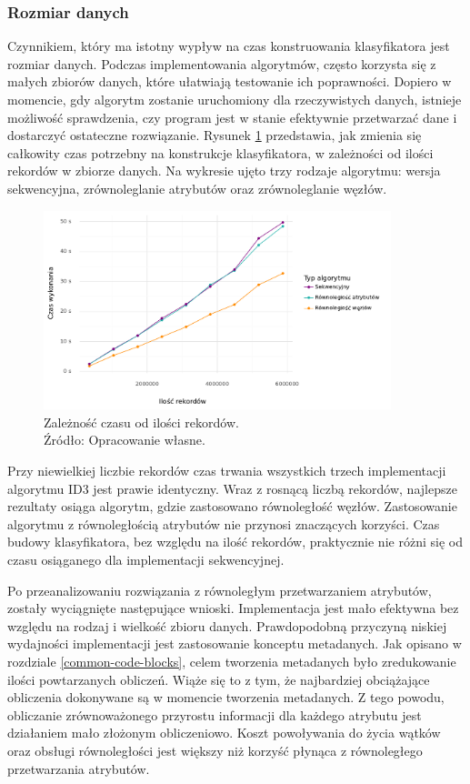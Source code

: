 \documentclass[12pt]{article}
\begin{document}
\subsubsection{Rozmiar danych}
Czynnikiem, który ma istotny wypływ na czas konstruowania klasyfikatora jest rozmiar
danych. Podczas implementowania algorytmów, często korzysta się z małych zbiorów danych,
które ułatwiają testowanie ich poprawności. Dopiero w momencie, gdy algorytm zostanie
uruchomiony dla rzeczywistych danych, istnieje możliwość sprawdzenia, czy program jest w stanie
efektywnie przetwarzać dane i dostarczyć ostateczne rozwiązanie. 
Rysunek \ref{fig:analysis} przedstawia, jak zmienia się całkowity czas potrzebny na konstrukcje
klasyfikatora, w zależności od ilości rekordów w zbiorze danych. Na wykresie ujęto trzy rodzaje algorytmu:
wersja sekwencyjna, zrównoleglanie atrybutów oraz zrównoleglanie węzłów.

\begin{figure}[H]
    \centering
	\includegraphics[width=0.9\textwidth]{analysis.pdf}
    \caption{Zależność czasu od ilości rekordów.\\Źródło: Opracowanie własne.}
    \label{fig:analysis}
\end{figure}

Przy niewielkiej liczbie rekordów czas trwania wszystkich trzech implementacji algorytmu ID3 jest prawie identyczny.
Wraz z rosnącą liczbą rekordów, najlepsze rezultaty osiąga algorytm, gdzie zastosowano równoległość węzłów. Zastosowanie
algorytmu z równoległością atrybutów nie przynosi znaczących korzyści. Czas budowy klasyfikatora, bez względu na ilość rekordów,
praktycznie nie różni się od czasu osiąganego dla implementacji sekwencyjnej. 

Po przeanalizowaniu rozwiązania z równoległym przetwarzaniem atrybutów, zostały wyciągnięte następujące wnioski.
Implementacja jest mało efektywna bez względu na rodzaj i wielkość zbioru danych. Prawdopodobną przyczyną niskiej
wydajności implementacji jest zastosowanie konceptu metadanych. Jak opisano w rozdziale \ref{common-code-blocks}, celem tworzenia
metadanych było zredukowanie ilości powtarzanych obliczeń. Wiąże się to z tym, że najbardziej obciążające obliczenia
dokonywane są w momencie tworzenia metadanych. Z tego powodu, obliczanie zrównoważonego przyrostu informacji dla każdego
atrybutu jest działaniem mało złożonym obliczeniowo. Koszt powoływania do życia wątków oraz obsługi równoległości jest większy
niż korzyść płynąca z równoległego przetwarzania atrybutów.
\end{document}

